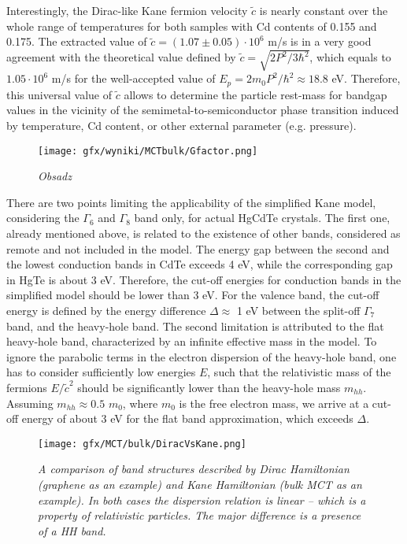 \documentclass[titlepage,a4paper]{book}
\begin{document}
Interestingly, the Dirac-like Kane fermion velocity $\tilde{c}$ is nearly constant over the whole range of temperatures for both samples with Cd contents of 0.155 and 0.175. The extracted value of $\tilde{c} = (1.07 \pm 0.05)\cdot 10^6$ m/s is in a very good agreement with the theoretical value defined by $\tilde{c} = \sqrt{2 P^2/3\hbar^2}$, which equals to $1.05 \cdot 10^6$ m/s for the well-accepted value of $E_p = 2m_0 P^2/ \hbar^2 \approx 18.8$ eV. Therefore, this universal value of $\tilde{c}$ allows to determine the particle rest-mass for bandgap values in the vicinity of the semimetal-to-semiconductor phase transition induced by temperature, Cd content, or other external parameter (e.g. pressure).

\begin{figure}[ht]
	\centering
	\texttt{[image: gfx/wyniki/MCTbulk/Gfactor.png]}
	\vspace{-10pt}
	\caption{\textit{Obsadz}}
	\label{fig:Bulk_gfactor}
\end{figure}

There are two points limiting the applicability of the simplified Kane model, considering the $\Gamma_6$ and $\Gamma_8$ band only, for actual HgCdTe crystals. The first one, already mentioned above, is related to the existence of other bands, considered as remote and not included in the model. The energy gap between the second and the lowest conduction bands in CdTe exceeds 4 eV, while the corresponding gap in HgTe is about 3 eV. Therefore, the cut-off energies for conduction bands in the simplified model should be lower than 3 eV. For the valence band, the cut-off energy is defined by the energy difference $\Delta \approx$ 1 eV between the split-off $\Gamma_7$ band, and the heavy-hole band. The second limitation is attributed to the flat heavy-hole band, characterized by an infinite effective mass in the model. To ignore the parabolic terms in the electron dispersion of the heavy-hole band, one has to consider sufficiently low energies $E$, such that the relativistic mass of the fermions $E/\tilde{c}^2$ should be significantly lower than the heavy-hole mass $m_{hh}$. Assuming $m_{hh} \approx 0.5$ $m_0$, where $m_0$ is the free electron mass, we arrive at a cut-off energy of about 3 eV for the flat band approximation, which exceeds $\Delta$.
\begin{figure}[ht]
	\centering
	\texttt{[image: gfx/MCT/bulk/DiracVsKane.png]}
	\vspace{-10pt}
	\caption{\textit{A comparison of band structures described by Dirac Hamiltonian (graphene as an example) and Kane Hamiltonian (bulk MCT as an example). In both cases the dispersion relation is linear -- which is a property of relativistic particles. The major difference is a presence of a HH band.}}
	\label{fig:DiracVsKane}
\end{figure}
\end{document}
